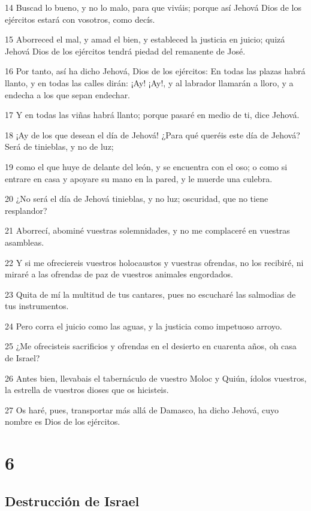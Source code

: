 \par 14 Buscad lo bueno, y no lo malo, para que viváis; porque así Jehová Dios de los ejércitos estará con vosotros, como decís.
\par 15 Aborreced el mal, y amad el bien, y estableced la justicia en juicio; quizá Jehová Dios de los ejércitos tendrá piedad del remanente de José.
\par 16 Por tanto, así ha dicho Jehová, Dios de los ejércitos: En todas las plazas habrá llanto, y en todas las calles dirán: ¡Ay! ¡Ay!, y al labrador llamarán a lloro, y a endecha a los que sepan endechar.
\par 17 Y en todas las viñas habrá llanto; porque pasaré en medio de ti, dice Jehová.
\par 18 ¡Ay de los que desean el día de Jehová! ¿Para qué queréis este día de Jehová? Será de tinieblas, y no de luz;
\par 19 como el que huye de delante del león, y se encuentra con el oso; o como si entrare en casa y apoyare su mano en la pared, y le muerde una culebra.
\par 20 ¿No será el día de Jehová tinieblas, y no luz; oscuridad, que no tiene resplandor?
\par 21 Aborrecí, abominé vuestras solemnidades, y no me complaceré en vuestras asambleas.
\par 22 Y si me ofreciereis vuestros holocaustos y vuestras ofrendas, no los recibiré, ni miraré a las ofrendas de paz de vuestros animales engordados. 
\par 23 Quita de mí la multitud de tus cantares, pues no escucharé las salmodias de tus instrumentos.
\par 24 Pero corra el juicio como las aguas, y la justicia como impetuoso arroyo.
\par 25 ¿Me ofrecisteis sacrificios y ofrendas en el desierto en cuarenta años, oh casa de Israel?
\par 26 Antes bien, llevabais el tabernáculo de vuestro Moloc y Quiún, ídolos vuestros, la estrella de vuestros dioses que os hicisteis.
\par 27 Os haré, pues, transportar más allá de Damasco, ha dicho Jehová, cuyo nombre es Dios de los ejércitos.

\chapter{6}

\section*{Destrucción de Israel}

